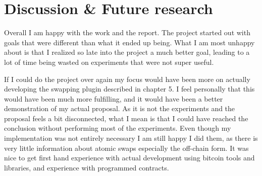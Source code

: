 \chapter{Discussion \& Future research}
Overall I am happy with the work and the report. The project started out with goals that were different than what it ended up being. What I am most unhappy about is that I realized so late into the project a much better goal, leading to a lot of time being wasted on experiments that were not super useful. 

If I could do the project over again my focus would have been more on actually developing the swapping plugin described in chapter 5. I feel personally that this would have been much more fulfilling, and it would have been a better demonstration of my actual proposal. As it is not the experiments and the proposal feels a bit disconnected, what I mean is that I could have reached the conclusion without performing most of the experiments. Even though my implementation was not entirely necessary I am still happy I did them, as there is very little information about atomic swaps especially the off-chain form. It was nice to get first hand experience with actual development using bitcoin tools and libraries, and experience with programmed contracts. 